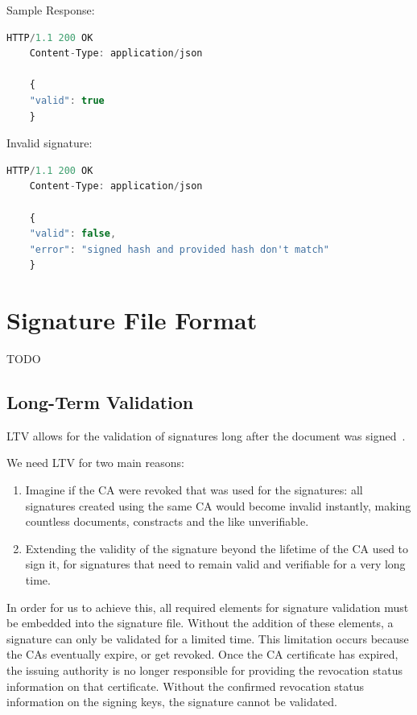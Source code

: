 Sample Response:

\begin{lstlisting}[caption={sign response}, captionpos=b, language=JavaScript, label={lst:verifyresponse}]
    HTTP/1.1 200 OK
    Content-Type: application/json

    {
    "valid": true
    }
\end{lstlisting}

Invalid signature:

\begin{lstlisting}[caption={sign response}, captionpos=b, language=JavaScript, label={lst:verifyresponsefailed}]
    HTTP/1.1 200 OK
    Content-Type: application/json

    {
    "valid": false,
    "error": "signed hash and provided hash don't match"
    }
\end{lstlisting}

\section{Signature File Format}
TODO
\subsection{Long-Term Validation}
\gls{LTV} allows for the validation of signatures long after the document was signed~\cite{etsipades}.

We need \gls{LTV} for two main reasons:
\begin{enumerate}
    \item Imagine if the \gls{CA} were revoked that was used for the signatures: all signatures created using the same \gls{CA} would become invalid instantly, making countless documents, constracts and the like unverifiable.
    \item Extending the validity of the signature beyond the lifetime of the \gls{CA} used to sign it, for signatures that need to remain valid and verifiable for a very long time.
\end{enumerate}
In order for us to achieve this, all required elements for signature validation must be embedded into the signature file.
Without the addition of these elements, a signature can only be validated for a limited time.
This limitation occurs because the \gls{CA}s eventually expire, or get revoked.
Once the \gls{CA} certificate has expired, the issuing authority is no longer responsible for providing the revocation status information on that certificate.
Without the confirmed revocation status information on the signing keys, the signature cannot be validated.

